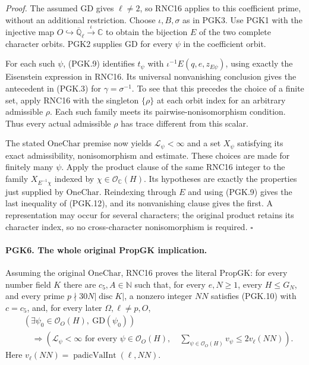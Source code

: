 \emph{Proof.}
The assumed \(\mathrm{GD}\) gives \(\ell\ne2\), so RNC16
applies to this coefficient prime, without an additional
restriction. Choose \(\iota,B,\sigma\) as in PGK3. Use PGK1
with the injective map
\(O\hookrightarrow\overline{\mathbb Q}_\ell
\xrightarrow{\iota}\mathbb C\) to obtain the bijection \(E\)
of the two complete character orbits. PGK2 supplies
\(\mathrm{GD}\) for every \(\psi\) in the coefficient orbit.

For each such \(\psi\), (PGK.9) identifies \(t_\psi\) with
\(\iota^{-1}E(q,e,z_{E\psi})\), using exactly the Eisenstein
expression in RNC16. Its universal nonvanishing conclusion
gives the antecedent in (PGK.3) for \(\gamma=\sigma^{-1}\).
To see that this precedes the choice of a finite set, apply
RNC16 with the singleton \(\{\rho\}\) at each orbit index
for an arbitrary admissible \(\rho\). Each such family meets
its pairwise-nonisomorphism condition. Thus every actual
admissible \(\rho\) has trace different from this scalar.

The stated \(\mathrm{OneChar}\) premise now yields
\(\mathcal L_\psi<\infty\) and a set \(X_\psi\) satisfying
its exact admissibility, nonisomorphism and estimate. These
choices are made for finitely many \(\psi\). Apply the product
clause of the same RNC16 integer to the family
\(X_{E^{-1}\chi}\) indexed by
\(\chi\in\mathcal O_{\mathbb C}(H)\). Its hypotheses are
exactly the properties just supplied by \(\mathrm{OneChar}\).
Reindexing through \(E\) and using (PGK.9) gives the last
inequality of (PGK.12), and its nonvanishing clause gives the
first. A representation may occur for several characters;
the original product retains its character index, so no
cross-character nonisomorphism is required. \hfill\(\square\)

\paragraph{PGK6. The whole original PropGK implication.}
\label{claim:PGK6}
Assuming the original \(\mathrm{OneChar}\), RNC16 proves the
literal \(\mathrm{PropGK}\): for every number field \(K\) there
are \(c_5,A\in\mathbb N\) such that, for every
\(e,N\ge1\), every \(H\le G_N\), and every prime
\(p\nmid30N|\operatorname{disc}K|\), a nonzero integer \(NN\)
satisfies (PGK.10) with \(c=c_5\), and, for every later
\(\Omega,\ell\ne p,O\),
\[
 \begin{split}
 &(\exists\psi_0\in\mathcal O_O(H),\ \mathrm{GD}(\psi_0))\\
 &\quad\Longrightarrow
   \left(\mathcal L_\psi<\infty\text{ for every }\psi\in
                        \mathcal O_O(H),\quad
     \sum_{\psi\in\mathcal O_O(H)}v_\psi
                           \le2v_\ell(NN)\right).
 \end{split}                                                     \tag{PGK.13}
\]
Here \(v_\ell(NN)=\operatorname{padicValInt}(\ell,NN)\).

